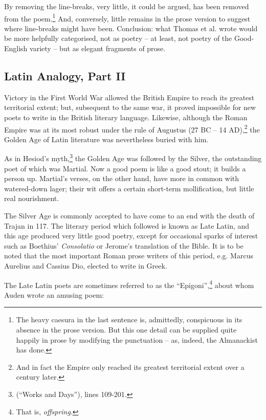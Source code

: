 \documentclass[0main.tex]{subfiles}
\begin{document}
\bigskip

By removing the line-breaks, very little, it could be argued, has been removed from the poem.\footnote{The heavy caesura in the last sentence is, admittedly, conspicuous in its absence in the prose version. But this one detail can be supplied quite happily in prose by modifying the punctuation -- as, indeed, the Almanackist has done.} And, conversely, little remains in the prose version to suggest where line-breaks might have been. Conclusion: what Thomas et al. wrote would be more helpfully categorised, not as poetry -- at least, not poetry of the Good-English variety -- but as elegant fragments of prose.

\subsection{Latin Analogy, Part II}

Victory in the First World War allowed the British Empire to reach its greatest territorial extent; but, subsequent to the same war, it proved impossible for new poets to write in the British literary language. Likewise, although the Roman Empire was at its most robust under the rule of Augustus (27 BC -- 14 AD),\footnote{And in fact the Empire only reached its greatest territorial extent over a century later.} the Golden Age of Latin literature was nevertheless buried with him.

As in Hesiod's myth,\footnote{{\it {}} (``Works and Days''), lines 109-201.} the Golden Age was followed by the Silver, the outstanding poet of which was Martial. Now a good poem is like a good stout; it builds a person up. Martial's verses, on the other hand, have more in common with watered-down lager; their wit offers a certain short-term mollification, but little real nourishment.

The Silver Age is commonly accepted to have come to an end with the death of Trajan in 117. The literary period which followed is known as Late Latin, and this age produced very little good poetry, except for occasional sparks of interest such as Boethius' \emph{Consolatio} or Jerome's translation of the Bible. It is to be noted that the most important Roman prose writers of this period, e.g. Marcus Aurelius and Cassius Dio, elected to write in Greek.

The Late Latin poets are sometimes referred to as the ``Epigoni'',\footnote{That is, \emph{offspring}.} about whom Auden wrote an amusing poem:
\end{document}

